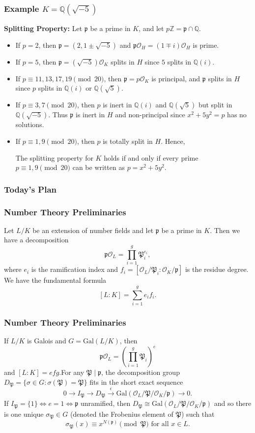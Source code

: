 \documentclass{beamer}
\newcommand{\Gal}{\mathrm{Gal}}
\newcommand{\PP}{\mathfrak{P}}
\newcommand{\QQ}{\mathbb{Q}}
\newcommand{\ZZ}{\mathbb{Z}}
\newcommand{\pp}{\mathfrak{p}}
\theoremstyle{plain}
\begin{document}
\begin{frame}
    \frametitle{Example $K=\QQ(\sqrt{-5})$}
    \textbf{Splitting Property:}
    Let $\pp$ be a prime in $K$, and let $p\ZZ=\pp\cap\QQ$. 
    \pause
    \begin{itemize}
        \item If $p=2$, then $\pp=(2,1\pm\sqrt{-5})$ and $\pp\mathcal{O}_H=(1\mp i)\mathcal{O}_H$ is prime.\pause
        \item If $p=5$, then $\pp=(\sqrt{-5})\mathcal{O}_K$ splits in $H$ since $5$ splits in $\QQ(i)$.\pause
        \item If $p\equiv 11,13,17,19 \pmod{20}$, then $\pp=p\mathcal{O}_K$ is principal, and $\pp$ splits in $H$ since $p$ splits in $\QQ(i)$ or $\QQ(\sqrt{5})$.\pause
        \item If $p\equiv 3,7\pmod{20}$, then $p$ is inert in $\QQ(i)$ and $\QQ(\sqrt{5})$ but split in $\QQ(\sqrt{-5})$. Thus $\pp$ is inert in $H$ and non-principal since $x^2+5y^2=p$ has no solutions.\pause
        \item If $p\equiv 1,9\pmod{20}$, then $p$ is totally split in $H$. \pause Hence,
        \begin{corollary}
            The splitting property for $K$ holds if and only if every prime $p\equiv1,9\pmod{20}$ can be written as $p=x^2+5y^2$. 
        \end{corollary}
    \end{itemize}
\end{frame}

\begin{frame}
    \frametitle{Today's Plan}
    
\end{frame}


\begin{frame}
    \frametitle{Number Theory Preliminaries}
    Let $L/K$ be an extension of number fields and let $\pp$ be a prime in $K$. \pause Then we have a decomposition
    $$\pp\mathcal{O}_L=\prod_{i=1}^g\PP_i^{e_i},$$
    where $e_i$ is the ramification index and $f_i=[\mathcal{O}_L/\PP_i:\mathcal{O}_K/\pp]$ is the residue degree. \pause We have the fundamental formula
    $$[L:K]=\sum_{i=1}^ge_if_i.$$
    
\end{frame}


\begin{frame}
    \frametitle{Number Theory Preliminaries}
    If $L/K$ is Galois and $G=\Gal(L/K)$, then 
    $$\pp\mathcal{O}_L=\left(\prod_{i=1}^g\PP_i\right)^e$$
    and $[L:K]=efg$.\pause For any $\PP\mid\pp$, the decomposition group $D_\PP=\{\sigma\in G:\sigma(\PP)=\PP\}$ fits in the short exact sequence
    $$0\longrightarrow I_\PP\longrightarrow D_\PP\xrightarrow{\ \epsilon\ }\Gal(\mathcal{O}_L/\PP/\mathcal{O}_K/\pp)\longrightarrow0.$$\pause
    If $I_\PP=\{1\}\iff e=1\iff \pp$ unramified, then $D_\PP\cong \Gal(\mathcal{O}_L/\PP/\mathcal{O}_K/\pp)$ and so there is one unique $\sigma_{\PP}\in G$ (denoted the Frobenius element of $\PP$) such that 
    $$\sigma_{\PP}(x)\equiv x^{N(\pp)}\pmod{\PP}\text{ for all }x\in L.$$
\end{frame}
\end{document}
